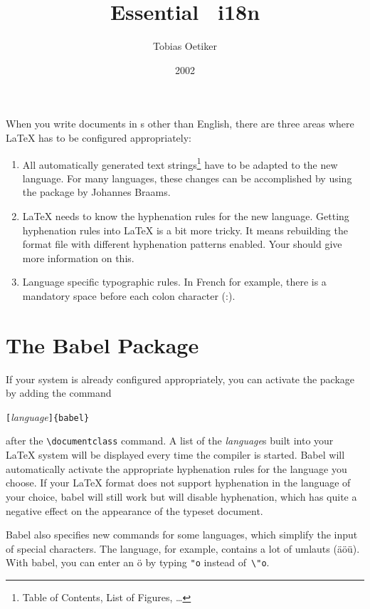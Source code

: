 \documentclass[twoside,letterpaper,11pt]{article}
\begin{document}
\title{Essential \LaTeXe\ i18n}
\author{Tobias Oetiker}
\date{2002}

\maketitle

 When you write documents in s
other than English, there are three areas where \LaTeX{} has to be
configured appropriately:

\begin{enumerate}
\item All automatically generated text strings\footnote{Table of
    Contents, List of Figures, \ldots} have to be adapted to the new
  language.  For many languages, these changes can be accomplished by
  using the  package by Johannes Braams.
\item \LaTeX{} needs to know the hyphenation rules for the new
  language. Getting hyphenation rules into \LaTeX{} is a bit more
  tricky. It means rebuilding the format file with different
  hyphenation patterns enabled. Your \guide{} should give more
  information on this.
\item Language specific typographic rules. In French for example, there is a
  mandatory space before each colon character (:).
\end{enumerate}

\section{The Babel Package}

If your system is already configured appropriately, you can activate
the  package by adding the command
\begin{lscommand}
\verb|[|\emph{language}\verb|]{babel}| 
\end{lscommand}
\noindent after the \verb|\documentclass| command. A list of the
\emph{language}s built into your \LaTeX{} system will be displayed
every time the compiler is started. Babel will
automatically activate the appropriate hyphenation rules for the
language you choose. If your \LaTeX{} format does not support
hyphenation in the language of your choice, babel will still work but
will disable hyphenation, which has quite a negative effect on the
appearance of the typeset document.

\textsf{Babel} also specifies new commands for some languages, which
simplify the input of special characters. The  language, for
example, contains a lot of umlauts (\"a\"o\"u).  With \textsf{babel},
you can enter an \"o by typing \verb|"o| instead of~\verb|\"o|.
\end{document}
